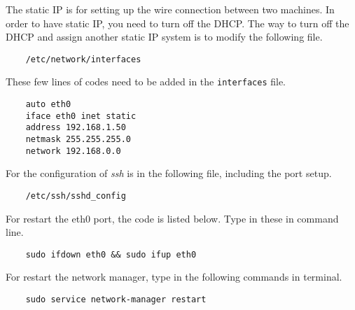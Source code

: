 The static IP is for setting up the wire connection between two machines. In order to have static
IP, you need to turn off the DHCP. The way to turn off the DHCP and assign another static IP system
is to modify the following file.

\begin{lstlisting}
    /etc/network/interfaces
\end{lstlisting}

These few lines of codes need to be added in the \verb+interfaces+ file.

\begin{lstlisting}
    auto eth0
    iface eth0 inet static
    address 192.168.1.50
    netmask 255.255.255.0
    network 192.168.0.0
\end{lstlisting}

For the configuration of \textit{ssh} is in the following file, including the port setup.

\begin{lstlisting}
    /etc/ssh/sshd_config
\end{lstlisting}

For restart the eth0 port, the code is listed below. Type in these in command line.
\begin{lstlisting}
    sudo ifdown eth0 && sudo ifup eth0
\end{lstlisting}

For restart the network manager, type in the following commands in terminal.
\begin{lstlisting}
    sudo service network-manager restart
\end{lstlisting}
